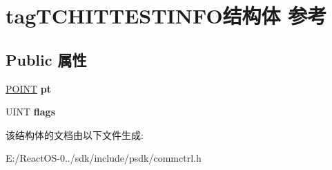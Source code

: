 \hypertarget{structtag_t_c_h_i_t_t_e_s_t_i_n_f_o}{}\section{tag\+T\+C\+H\+I\+T\+T\+E\+S\+T\+I\+N\+F\+O结构体 参考}
\label{structtag_t_c_h_i_t_t_e_s_t_i_n_f_o}
\subsection*{Public 属性}
\begin{DoxyCompactItemize}
\item 
\mbox{\label{structtag_t_c_h_i_t_t_e_s_t_i_n_f_o_ac422798bd1f3f30f97879765a5301210}} 
\hyperlink{structtag_p_o_i_n_t}{P\+O\+I\+NT} {\bfseries pt}
\item 
\mbox{\label{structtag_t_c_h_i_t_t_e_s_t_i_n_f_o_ad32eee8ab4e814cfa6a35cc9bb78c4bc}} 
U\+I\+NT {\bfseries flags}
\end{DoxyCompactItemize}


该结构体的文档由以下文件生成\+:\begin{DoxyCompactItemize}
\item 
E\+:/\+React\+O\+S-\/0../sdk/include/psdk/commctrl.\+h\end{DoxyCompactItemize}
